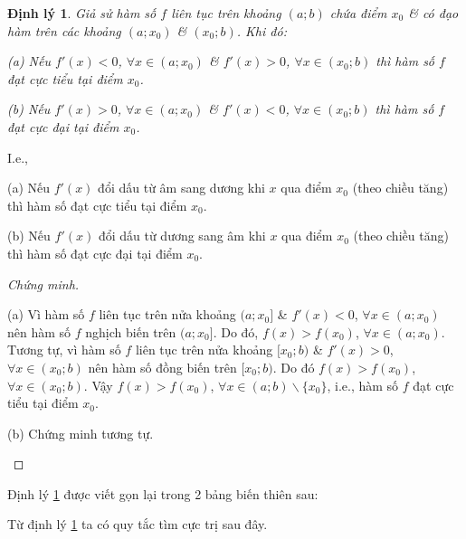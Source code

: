\documentclass[oneside]{book}
\numberwithin{equation}{section}
\newtheorem{dinhly}{Định lý}[section]
\begin{document}
\begin{dinhly}
	\label{thm:dieu kien du de ham so dat cuc tri}
	Giả sử hàm số $f$ liên tục trên khoảng $(a;b)$ chứa điểm $x_0$ \& có đạo hàm trên các khoảng $(a;x_0)$ \& $(x_0;b)$. Khi đó:
	\begin{enumerate*}
		\item[(a)] Nếu $f'(x) < 0$, $\forall x\in(a;x_0)$ \& $f'(x) > 0$, $\forall x\in(x_0;b)$ thì hàm số $f$ đạt cực tiểu tại điểm $x_0$.
		\item[(b)] Nếu $f'(x) > 0$, $\forall x\in(a;x_0)$ \& $f'(x) < 0$, $\forall x\in(x_0;b)$ thì hàm số $f$ đạt cực đại tại điểm $x_0$.
	\end{enumerate*}
\end{dinhly}
I.e.,
\begin{enumerate*}
	\item[(a)] Nếu $f'(x)$ đổi dấu từ âm sang dương khi $x$ qua điểm $x_0$  (theo chiều tăng) thì hàm số đạt cực tiểu tại điểm $x_0$.
	\item[(b)] Nếu $f'(x)$ đổi dấu từ dương sang âm khi $x$ qua điểm $x_0$ (theo chiều tăng) thì hàm số đạt cực đại tại điểm $x_0$.
\end{enumerate*}

\begin{proof}[Chứng minh]
	\begin{enumerate*}
		\item[(a)] Vì hàm số $f$ liên tục trên nửa khoảng $(a;x_0]$ \& $f'(x) < 0$, $\forall x\in(a;x_0)$ nên hàm số $f$ nghịch biến trên $(a;x_0]$. Do đó, $f(x) > f(x_0)$, $\forall x\in(a;x_0)$. Tương tự, vì hàm số $f$ liên tục trên nửa khoảng $[x_0;b)$ \& $f'(x) > 0$, $\forall x\in(x_0;b)$ nên hàm số đồng biến trên $[x_0;b)$. Do đó $f(x) > f(x_0)$, $\forall x\in(x_0;b)$. Vậy $f(x) > f(x_0)$, $\forall x\in(a;b)\backslash\{x_0\}$, i.e., hàm số $f$ đạt cực tiểu tại điểm $x_0$.
		\item[(b)] Chứng minh tương tự.
	\end{enumerate*}
\end{proof}
Định lý \ref{thm:dieu kien du de ham so dat cuc tri} được viết gọn lại trong 2 bảng biến thiên sau:

\begin{center}
	\hspace{1cm}
\end{center}
Từ định lý \ref{thm:dieu kien du de ham so dat cuc tri} ta có quy tắc tìm cực trị sau đây.
\end{document}
